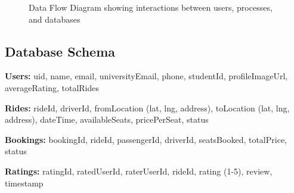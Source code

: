 \documentclass[12pt,a4paper]{article}
\begin{document}
\begin{figure}[H]
    \centering
    \caption{Data Flow Diagram showing interactions between users, processes, and databases}
    \label{fig:dataflow}
\end{figure}

\subsection{Database Schema}

\textbf{Users:} uid, name, email, universityEmail, phone, studentId, profileImageUrl, averageRating, totalRides

\textbf{Rides:} rideId, driverId, fromLocation (lat, lng, address), toLocation (lat, lng, address), dateTime, availableSeats, pricePerSeat, status

\textbf{Bookings:} bookingId, rideId, passengerId, driverId, seatsBooked, totalPrice, status

\textbf{Ratings:} ratingId, ratedUserId, raterUserId, rideId, rating (1-5), review, timestamp
\end{document}

